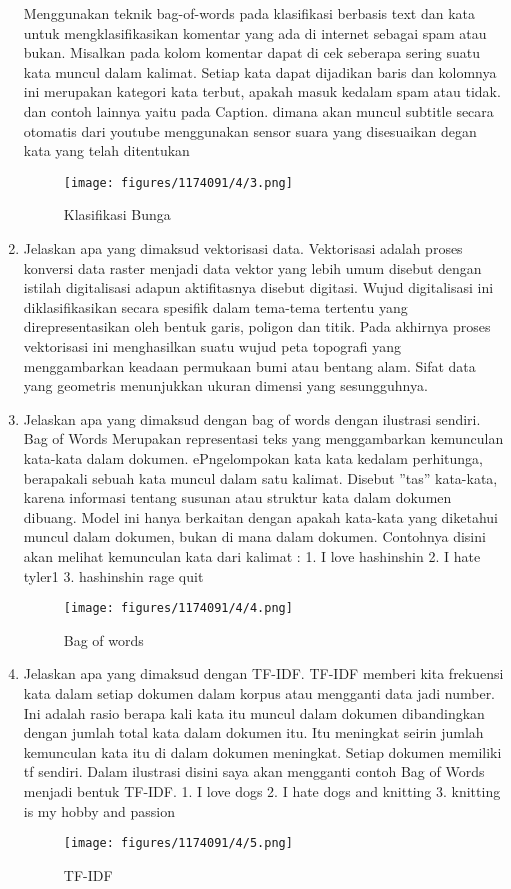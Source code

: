 \begin{enumerate}
	Menggunakan teknik bag-of-words pada klasifikasi berbasis text dan kata untuk mengklasifikasikan komentar yang ada di internet sebagai spam atau bukan. Misalkan pada kolom komentar dapat di cek seberapa sering suatu kata muncul dalam kalimat. Setiap kata dapat dijadikan baris dan kolomnya ini merupakan kategori kata terbut, apakah masuk kedalam spam atau tidak. dan contoh lainnya yaitu pada Caption. dimana akan muncul subtitle secara otomatis dari youtube menggunakan sensor suara yang disesuaikan degan kata yang telah ditentukan
	\begin{figure}[H]
	\centering
		\texttt{[image: figures/1174091/4/3.png]}
		\caption{Klasifikasi Bunga}
	\end{figure}

	\item Jelaskan apa yang dimaksud vektorisasi data.
	\hfill\break
	Vektorisasi adalah proses konversi data raster menjadi data vektor yang lebih umum disebut dengan istilah digitalisasi adapun aktifitasnya disebut digitasi. Wujud digitalisasi ini diklasifikasikan secara spesifik dalam tema-tema tertentu yang direpresentasikan oleh bentuk garis, poligon dan titik. Pada akhirnya proses vektorisasi ini menghasilkan suatu wujud peta topografi yang menggambarkan keadaan permukaan bumi atau bentang alam. Sifat data yang geometris menunjukkan ukuran dimensi yang sesungguhnya. 

	\item Jelaskan apa yang dimaksud dengan bag of words dengan ilustrasi sendiri.
	\hfill\break
	Bag of Words Merupakan representasi teks yang menggambarkan kemunculan kata-kata dalam dokumen. ePngelompokan kata kata kedalam perhitunga, berapakali sebuah kata muncul dalam satu kalimat. Disebut ”tas” kata-kata, karena informasi tentang susunan atau struktur kata dalam dokumen dibuang. Model ini hanya berkaitan dengan apakah kata-kata yang diketahui muncul dalam dokumen, bukan di mana dalam dokumen.
	Contohnya disini akan melihat kemunculan kata dari kalimat :
1. I love hashinshin
2. I hate tyler1
3. hashinshin rage quit

	\begin{figure}[H]
	\centering
		\texttt{[image: figures/1174091/4/4.png]}
		\caption{Bag of words}
	\end{figure}

	\item Jelaskan apa yang dimaksud dengan TF-IDF.
	\hfill\break
	TF-IDF memberi kita frekuensi kata dalam setiap dokumen dalam korpus atau mengganti data jadi number. Ini adalah rasio berapa kali kata itu muncul dalam dokumen dibandingkan dengan jumlah total kata dalam dokumen itu. Itu meningkat seirin jumlah kemunculan kata itu di dalam dokumen meningkat. Setiap dokumen memiliki tf sendiri. Dalam ilustrasi disini saya akan mengganti contoh Bag of Words menjadi bentuk TF-IDF.
1. I love dogs
2. I hate dogs and knitting
3. knitting is my hobby and passion


	\begin{figure}[H]
	\centering
		\texttt{[image: figures/1174091/4/5.png]}
		\caption{TF-IDF}
	\end{figure}
\end{enumerate}


